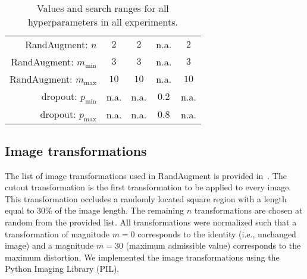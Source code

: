 \begin{table}
\begin{tabular}{r|cccc}
		RandAugment: $n$                    & $2$                   & $2$                   & n.a. & $2$                   \\ \hdashline[0.5pt/5pt]
		RandAugment: $m_{\text{min}}$       & $3$                   & $3$                   & n.a. &  $3$                 \\ \hdashline[0.5pt/5pt]
		RandAugment: $m_{\text{max}}$       & $10$                  & $10$                  & n.a.  &  $10$                \\ \hdashline[0.5pt/5pt]
		dropout: $p_{\text{min}}$           & n.a.                  & n.a.                  & $0.2$  & n.a.                 \\ \hdashline[0.5pt/5pt]
		dropout: $p_{\text{max}}$           & n.a.                  & n.a.                  & $0.8$  & n.a.
	\end{tabular}
	\caption{Values and search ranges for all hyperparameters in all experiments.}
	\label{tab:hyperparameters}
\end{table}


\subsection{Image transformations}
\label{sec:img_transf}
The list of image transformations used in RandAugment is provided in~. The cutout transformation is the first transformation to be applied to every image. This transformation occludes a randomly located square region with a length equal to $30\%$ of the image length. The remaining $n$ transformations are chosen at random from the provided list. All transformations were normalized such that a transformation of magnitude $m = 0$ corresponds to the identity (i.e., unchanged image) and a magnitude $m = 30$ (maximum admissible value) corresponds to the maximum distortion. We implemented the image transformations using the Python Imaging Library (PIL).

